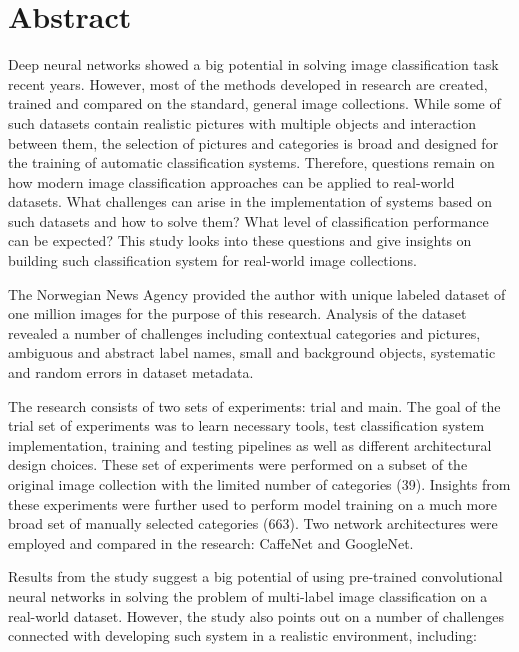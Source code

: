 \chapter*{Abstract}
Deep neural networks showed a big potential in solving image classification task recent years. However, most of the methods developed in research are created, trained and compared on the standard, general image collections. While some of such datasets contain realistic pictures with multiple objects and interaction between them, the selection of pictures and categories is broad and designed for the training of automatic classification systems. Therefore, questions remain on how modern image classification approaches can be applied to real-world datasets. What challenges can arise in the implementation of systems based on such datasets and how to solve them? What level of classification performance can be expected? This study looks into these questions and give insights on building such classification system for real-world image collections.

The Norwegian News Agency provided the author with unique labeled dataset of one million images for the purpose of this research. Analysis of the dataset revealed a number of challenges including contextual categories and pictures, ambiguous and abstract label names, small and background objects, systematic and random errors in dataset metadata. %

The research consists of two sets of experiments: trial and main. The goal of the trial set of experiments was to learn necessary tools, test classification system implementation, training and testing pipelines as well as different architectural design choices. These set of experiments were performed on a subset of the original image collection with the limited number of categories (39). Insights from these experiments were further used to perform model training on a much more broad set of manually selected categories (663). Two network architectures were employed and compared in the research: CaffeNet and GoogleNet. %

Results from the study suggest a big potential of using pre-trained convolutional neural networks in solving the problem of multi-label image classification on a real-world dataset. However, the study also points out on a number of challenges connected with developing such system in a realistic environment, including:

